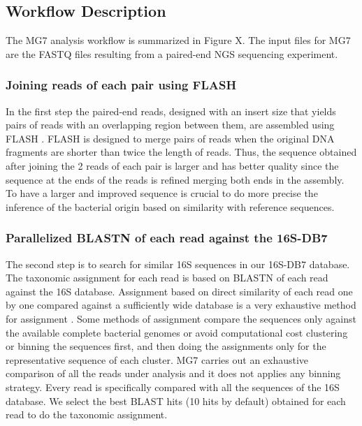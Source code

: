 \documentclass{frontiersSCNS} %
\begin{document}
\subsection{Workflow Description}\label{workflow-description}

The MG7 analysis workflow is summarized in Figure X. The input files for
MG7 are the FASTQ files resulting from a paired-end NGS sequencing
experiment.

\subsubsection{Joining reads of each pair using
FLASH}\label{joining-reads-of-each-pair-using-flash}

In the first step the paired-end reads, designed with an insert size
that yields pairs of reads with an overlapping region between them, are
assembled using FLASH \citep{magovc2011flash}. FLASH is designed to
merge pairs of reads when the original DNA fragments are shorter than
twice the length of reads. Thus, the sequence obtained after joining the
2 reads of each pair is larger and has better quality since the sequence
at the ends of the reads is refined merging both ends in the assembly.
To have a larger and improved sequence is crucial to do more precise the
inference of the bacterial origin based on similarity with reference
sequences.

\subsubsection{Parallelized BLASTN of each read against the
16S-DB7}\label{parallelized-blastn-of-each-read-against-the-16s-db7}

The second step is to search for similar 16S sequences in our 16S-DB7
database. The taxonomic assignment for each read is based on BLASTN of
each read against the 16S database. Assignment based on direct
similarity of each read one by one compared against a sufficiently wide
database is a very exhaustive method for assignment
\citep{segata2013computational} . Some methods of assignment compare the
sequences only against the available complete bacterial genomes or avoid
computational cost clustering or binning the sequences first, and then
doing the assignments only for the representative sequence of each
cluster. MG7 carries out an exhaustive comparison of all the reads under
analysis and it does not applies any binning strategy. Every read is
specifically compared with all the sequences of the 16S database. We
select the best BLAST hits (10 hits by default) obtained for each read
to do the taxonomic assignment.
\end{document}
